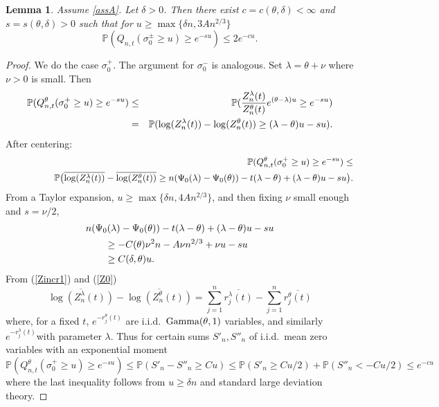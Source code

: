 \documentclass[11pt]{amsart}
\newtheorem{lemma}[theorem]{\sc Lemma}
\numberwithin{equation}{section}
\theoremstyle{remark}
\begin{document}
\begin{lemma}   Assume \eqref{assA}.  Let $\delta>0$.  
 Then there exist  $c=c({\theta}, \delta)<\infty$ and 
  $s=s({\theta}, \delta)>0$ such that for 
  $u\ge \max\{\delta n, 3An^{2/3}\} $
\begin{equation}
{\mathbb{P}}(Q_{n,t}(\sigma_0^\pm\ge u)\ge e^{-su})\le 2 e^{-c u}.
\end{equation}
\label{ubldlemma}\end{lemma}
\begin{proof}
We do the case $\sigma_0^+$.  The argument for $\sigma_0^-$ 
is analogous. Set $\lambda={\theta}+\nu$ where $\nu>0$ is small.
Then
\begin{eqnarray} 
{\nonumber}
{\mathbb{P}}(Q^{\theta}_{n,t}(\sigma_0^+\ge u)\ge e^{-su})&\le& {\mathbb{P}}(\frac{Z_n^{\lambda}(t)}{Z_{n}^{\theta}(t) }e^{({\theta}-\lambda) u}\ge e^{-su})\\
&=&{\mathbb{P}}(\log( Z_n^{\lambda}(t))-\log( Z_n^{\theta}(t))\ge (\lambda-{\theta})u-su).{\nonumber}
\end{eqnarray} 
After centering:
\begin{eqnarray} {\nonumber}
&&{\mathbb{P}}(Q^{\theta}_{n,t}(\sigma_0^+\ge u)\ge e^{-su})\le\\
&&\hskip15mm
{\mathbb{P}}\bigl(\overline{\log( Z_n^{\lambda}(t))}-\overline{\log( Z_n^{\theta}(t))}\ge 
n({\Psi_0}(\lambda)-{\Psi_0}({\theta}))-{t}(\lambda-{\theta})+(\lambda-{\theta})u-su\bigr).\label{ldp1}
\end{eqnarray} 
From a Taylor expansion, $u\ge  \max\{\delta n, 4An^{2/3}\} $, and then fixing $\nu$   small
enough and $s=\nu/2$,   
\begin{align*}
&n({\Psi_0}(\lambda)-{\Psi_0}({\theta}))- {t}(\lambda-{\theta})+(\lambda-{\theta})u-su \\
&\qquad \ge 
-C({\theta}) \nu^2 n -A \nu n^{2/3} +\nu u-s u\\
&\qquad\ge C(\delta, {\theta}) u.  {\nonumber}
\end{align*} 
From (\ref{Zincr1}) and (\ref{Z0}) 
\begin{equation} \label{diff}
\overline{\log( Z_n^{\lambda}(t))}-\overline{\log( Z_n^{\theta}(t))}=\sum_{j=1}^n \overline{r_j^{\lambda}(t)}-\sum_{j=1}^n \overline{r_j^{\theta}(t)}  
\end{equation}
where, for a fixed $t$,  
 $e^{-r^{\theta}_j(t)}$  are i.i.d.~$\textup{Gamma}({\theta},1)$ variables, and similarly $e^{-r^\lambda_j(t)}$with parameter $\lambda$.
 Thus for  certain sums $S'_n, S''_n$ of i.i.d.\ mean zero variables with an exponential moment
\[ 
{\mathbb{P}}(Q^{\theta}_{n,t}(\sigma_0^+\ge u)\ge e^{-su})\le  {\mathbb{P}}( S'_n-S''_n\ge Cu) \le {{\mathbb{P}}(S'_n\ge Cu/2)+{\mathbb{P}}(S''_n<-Cu/2)\le} e^{-cu} 
 \]
where the last inequality follows from $u\ge\delta n$ and   standard large deviation theory.
\end{proof}
\end{document}
